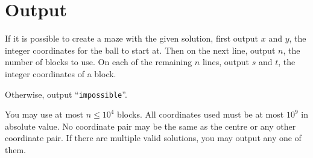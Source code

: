 \vspace{-1mm}

\section*{Output}

If it is possible to create a maze with the given solution,
first output $x$ and $y$, the integer coordinates for the ball to start at.
Then on the next line, output $n$, the number of blocks to use.
On each of the remaining $n$ lines, output $s$ and $t$, the integer coordinates of a block.

Otherwise, output ``\texttt{impossible}''.

You may use at most $n \le 10^4$ blocks. All coordinates
used must be at most $10^9$ in absolute value. No coordinate pair may be the
same as the centre or any other coordinate pair.
If there are multiple valid solutions, you may output any one of them.
